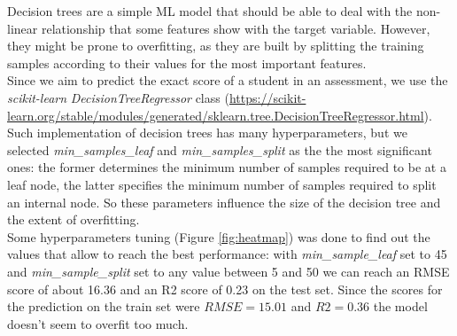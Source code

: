 \documentclass{article}
\begin{document}
Decision trees are a simple ML model that should be able to deal with the non-linear relationship that some features show with the target variable. However, they might be prone to overfitting, as they are built by splitting the training samples according to their values for the most important features.\\

Since we aim to predict the exact score of a student in an assessment, we use the \textit{scikit-learn} \textit{DecisionTreeRegressor} class (\url{https://scikit-learn.org/stable/modules/generated/sklearn.tree.DecisionTreeRegressor.html}). Such implementation of decision trees has many hyperparameters, but we selected \textit{min\_samples\_leaf} and \textit{min\_samples\_split} as the the most significant ones: the former determines the minimum number of samples required to be at a leaf node, the latter specifies the minimum number of samples required to split an internal node. So these parameters influence the size of the decision tree and the extent of overfitting.\\

Some hyperparameters tuning (Figure \ref{fig:heatmap}) was done to find out the values that allow to reach the best performance: with \textit{min\_sample\_leaf} set to 45 and \textit{min\_sample\_split} set to any value between 5 and 50 we can reach an RMSE score of about 16.36 and an R2 score of 0.23 on the test set. Since the scores for the prediction on the train set were $RMSE = 15.01$ and $R2 = 0.36$ the model doesn't seem to overfit too much. \\
\end{document}
